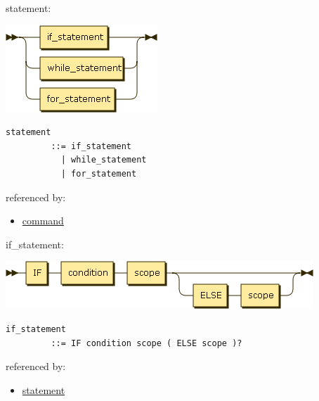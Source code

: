 \begin{minipage}{\textwidth}
\protect\hypertarget{statement}{}{statement:}

\includegraphics[width=2.25000in,height=1.29167in]{diagram/statement.png}

\begin{verbatim}
statement
         ::= if_statement
           | while_statement
           | for_statement
\end{verbatim}

referenced by:

\begin{itemize}
\tightlist
\item
  \protect\hyperlink{command}{command}
\end{itemize}

\end{minipage}

\begin{minipage}{\textwidth}
\protect\hypertarget{if_statement}{}{if\_statement:}

\includegraphics[width=4.56250in,height=0.70833in]{diagram/if_statement.png}

\begin{verbatim}
if_statement
         ::= IF condition scope ( ELSE scope )?
\end{verbatim}

referenced by:

\begin{itemize}
\tightlist
\item
  \protect\hyperlink{statement}{statement}
\end{itemize}

\end{minipage}

